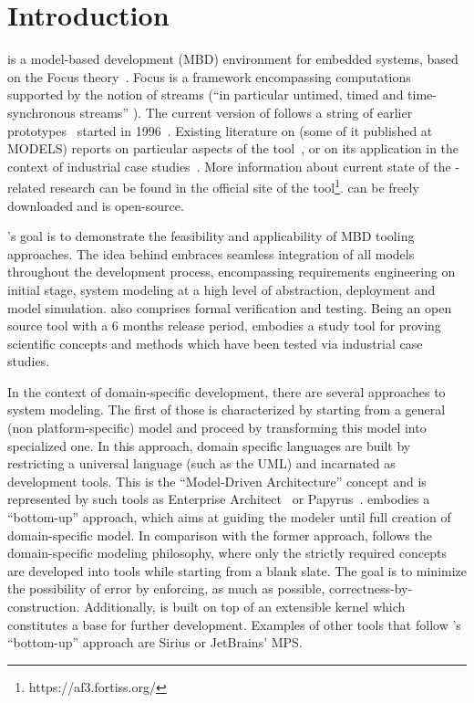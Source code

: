 \section{Introduction}

\autofocus is a model-based development (MBD) environment for embedded systems,
based on the \textsf{Focus} theory~\cite{Broy:2001:SDI:374869}. \textsf{Focus} is a framework
encompassing computations supported by the notion of streams (“in particular
untimed, timed and time-synchronous streams”
\cite{Holzl:2007:AST:1927558.1927576}). The current version of \af follows a
string of earlier
prototypes~\cite{Holzl:2007:AST:1927558.1927576,DBLP:conf/models/AravantinosVTHS15}
started in 1996~\cite{Huber96autofocus--}. Existing literature on \af (some of
it published at MODELS) reports on particular aspects of the
tool~\cite{TMR2013,TMR2011,Lucio:17,DBLP:conf/se/VossEH14,Barner2016,Diewald2016,Carlan2017},
or on its application in the context of industrial case
studies~\cite{2009-a-top-down-methodology-for-the-development-of-automotive-software,2011KeylessEntry,Bohm:2014:FSE:2593850.2593856,DBLP:conf/models/AravantinosVTHS15,Barner2017,Eder2017}.
More information about current state of the \af-related research can be found in
the official site of the tool\footnote{ https://af3.fortiss.org/}. \af can be
freely downloaded and is open-source.

\af's goal is to demonstrate the feasibility and applicability of
MBD tooling approaches. The idea behind \af embraces seamless integration of all models throughout the
development process, encompassing requirements engineering on initial stage, system
modeling at a high level of abstraction, deployment and model simulation. \af
also comprises formal verification and testing. Being an open source tool with a 6 months
release period, \af embodies a study tool for proving scientific concepts and
methods which have been tested via industrial case studies.

In the context of domain-specific development, there are several approaches to
system modeling. The first of those is characterized by starting from a general
(non platform-specific) model and proceed by transforming this model into
specialized one. In this approach, domain specific languages are built by
restricting a universal language (such as the UML) and incarnated as development
tools. This is the “Model-Driven Architecture” concept and is represented by
such tools as Enterprise Architect~\cite{SparxSystems} or
Papyrus~\cite{Papyrus}. \af embodies a “bottom-up” approach, which aims at
guiding the modeler until full creation of domain-specific model.
In comparison with the former approach, \af follows the domain-specific modeling
philosophy, where only the strictly required concepts are developed into tools while starting
from a blank slate. The goal is to minimize the possibility of error by
enforcing, as much as possible, correctness-by-construction. Additionally, \af
is built on top of an extensible kernel which constitutes a base for further
development. Examples of other tools that follow \af's ``bottom-up'' approach are
Sirius\cite{Sirius} or JetBrains' MPS\cite{MPS}.

